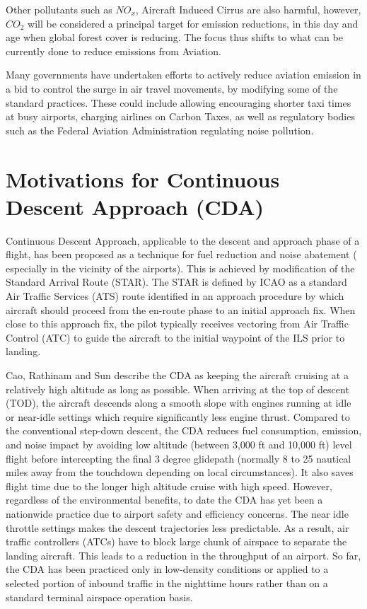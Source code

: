 \documentclass{aer1315-pretty}
\begin{document}
Other pollutants such as $NO_x$, Aircraft Induced Cirrus are also harmful, however, $CO_2$ will be considered a principal target for emission reductions, in this day and age when global forest cover is reducing. The focus thus shifts to what can be currently done to reduce emissions from Aviation. \par\par

Many governments have undertaken efforts to actively reduce aviation emission in a bid to control the surge in air travel movements, by modifying some of the standard practices. These could include allowing encouraging shorter taxi times at busy airports, charging airlines on Carbon Taxes, as well as regulatory bodies such as the Federal Aviation Administration regulating noise pollution.\par 

\section{Motivations for Continuous Descent Approach (CDA)}
\label{sec:CDA}
Continuous Descent Approach, applicable to the descent and approach phase of a flight, has been proposed as a technique for fuel reduction and noise abatement ( especially in the vicinity of the airports). This is achieved by modification of the Standard Arrival Route (STAR). The STAR is defined by ICAO as a standard Air Traffic Services (ATS) route identified in an approach procedure by which aircraft should proceed from the en-route phase to an initial approach fix. When close to this approach fix, the pilot typically receives vectoring from Air Traffic Control (ATC) to guide the aircraft to the initial waypoint of the ILS prior to landing.\par

Cao, Rathinam and Sun \cite{Cao:2011} describe the CDA as keeping the aircraft cruising at a relatively high altitude as long as possible. When arriving at the top of descent (TOD), the aircraft descends along a smooth slope with engines running at idle or near-idle settings which require significantly less engine thrust. Compared to the conventional step-down descent, the CDA reduces fuel consumption, emission, and noise impact by avoiding low altitude
(between 3,000 ft and 10,000 ft) level flight before intercepting the final 3 degree glidepath (normally 8 to 25 nautical miles away from the touchdown depending on local circumstances). It also saves flight time due to the longer high altitude cruise with high speed. However, regardless of the environmental benefits,
to date the CDA has yet been a nationwide practice due to airport safety and efficiency concerns. The near idle throttle settings makes the descent trajectories less predictable. As a result, air traffic controllers (ATCs) have to block large chunk of airspace to separate the landing aircraft. This leads to a reduction in
the throughput of an airport. So far, the CDA has been practiced only in low-density conditions or applied to a selected portion of inbound traffic in the nighttime hours rather than on a standard terminal airspace operation basis.
\end{document}
